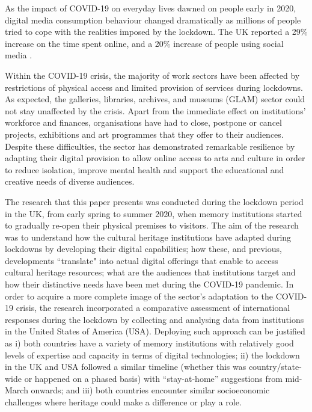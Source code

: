 \documentclass{egpubl}
\begin{document}
As the impact of COVID-19 on everyday lives dawned on people early in 2020, digital media consumption behaviour changed dramatically as millions of people tried to cope with the realities imposed by the lockdown. The UK reported a 29\% increase on the time spent online, and a 20\% increase of people using social media \cite{ofcom:2020}. 

Within the COVID-19 crisis, the majority of work sectors have been affected by restrictions of physical access and limited provision of services during lockdowns. As expected, the galleries, libraries, archives, and museums (GLAM) sector could not stay unaffected by the crisis. Apart from the immediate effect on institutions' workforce and finances, organisations have had to close, postpone or cancel projects, exhibitions and art programmes that they offer to their audiences. Despite these difficulties, the sector has demonstrated remarkable resilience by adapting their digital provision to allow online access to arts and culture in order to reduce isolation, improve mental health and support the educational and creative needs of diverse audiences.

The research that this paper presents was conducted during the lockdown period in the UK, from early spring to summer 2020, when memory institutions started to gradually re-open their physical premises to visitors. The aim of the research was to understand how the cultural heritage institutions have adapted during lockdowns by developing their digital capabilities; how these, and previous, developments ``translate" into actual digital offerings that enable to access cultural heritage resources; what are the audiences that institutions target and how their distinctive needs have been met during the COVID-19 pandemic. In order to acquire a more complete image of the sector's adaptation to the COVID-19 crisis, the research incorporated a comparative assessment of international responses during the lockdown by collecting and analysing data from institutions in the United States of America (USA). Deploying such approach can be justified as i) both countries have a variety of memory institutions with relatively good levels of expertise and capacity in terms of digital technologies; ii) the lockdown in the UK and USA followed a similar timeline (whether this was country/state-wide or happened on a phased basis) with ``stay-at-home'' suggestions from mid-March onwards; and iii) both countries encounter similar socioeconomic challenges where heritage could make a difference or play a role.
\end{document}

